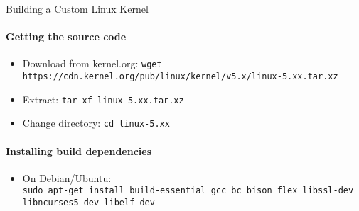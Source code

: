 \begin{KR}{Building a Custom Linux Kernel}
    \paragraph{Getting the source code}
    \begin{itemize}
        \item Download from kernel.org: \texttt{wget https://cdn.kernel.org/pub/linux/kernel/v5.x/linux-5.xx.tar.xz}
        \item Extract: \texttt{tar xf linux-5.xx.tar.xz}
        \item Change directory: \texttt{cd linux-5.xx}
    \end{itemize}
    
    \paragraph{Installing build dependencies}
    \begin{itemize}
        \item On Debian/Ubuntu: \\ \texttt{sudo apt-get install build-essential gcc bc bison flex libssl-dev libncurses5-dev libelf-dev}
    \end{itemize}

    \begin{minipage}{0.5\linewidth}

\end{minipage}
\end{KR}
